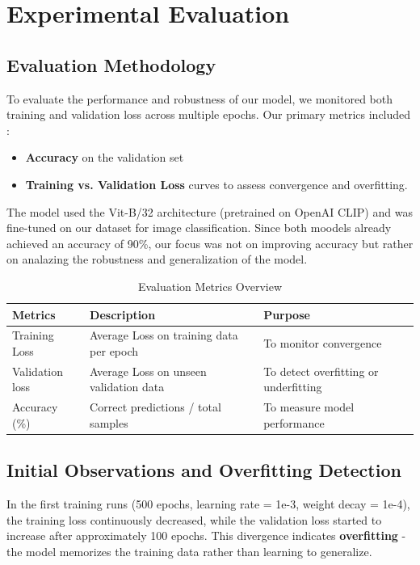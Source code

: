 \documentclass[12pt]{article}
\begin{document}
\section{Experimental Evaluation}

\subsection{Evaluation Methodology}
To evaluate the performance and robustness of our model, we monitored both training and validation loss across multiple epochs.
Our primary metrics included : 
\begin{itemize}
    \item \textbf{Accuracy} on the validation set 
    \item \textbf{Training vs. Validation Loss } curves to assess convergence and overfitting.
\end{itemize}

The model used the Vit-B/32 architecture (pretrained on OpenAI CLIP) and was fine-tuned on our dataset for image classification.
Since both moodels already achieved an accuracy of 90\%, our focus was not on improving accuracy but rather on analazing the robustness and generalization of the model.

\begin{table}[H]
\centering
\caption{Evaluation Metrics Overview}

\begin{tabular}{|l|l|l|}
\hline
\textbf{Metrics} & \textbf{Description} & \textbf{Purpose}\\ \hline
Training Loss & Average Loss on training data per epoch & To monitor convergence \\ \hline
Validation loss & Average Loss on unseen validation data & To detect overfitting or underfitting \\ \hline
Accuracy (\%) & Correct predictions / total samples & To measure model performance \\ \hline
\end{tabular}
\end{table}

\subsection{Initial Observations and Overfitting Detection}
In the first training runs (500 epochs, learning rate = 1e-3, weight decay = 1e-4), the training loss continuously decreased, while the validation loss started to increase after approximately 100 epochs.
This divergence indicates \textbf{overfitting} - the model memorizes the training data rather than learning to generalize.
\end{document}
